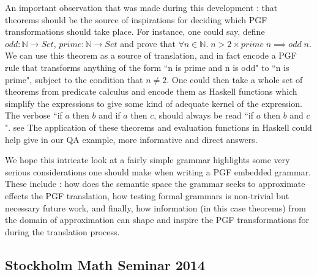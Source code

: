 An important observation that was made during this development : that theorems
should be the source of inspirations for deciding which PGF transformations
should take place. For instance, one could say, define $odd : \mathds{N}
\rightarrow Set$, $prime : \mathds{N} \rightarrow Set$ and prove that $\forall n
\in \mathds{N}.\; n > 2 \times prime\; n \implies odd\; n$. We can use this
theorem as a source of translation, and in fact encode a PGF rule that
transforms anything of the form ``n is prime and n is odd" to ``n is prime",
subject to the condition that $n \neq 2$. One could then take a whole set of
theorems from predicate calculus and encode them as Haskell functions which
simplify the expressions to give some kind of adequate kernel of the expression.
The verbose ``if $a$ then $b$ and if $a$ then $c$, should always be read ``if
$a$ then $b$ and $c$". see The application of these theorems and evaluation
functions in Haskell could help give in our QA example, more informative and
direct answers.

We hope this intricate look at a fairly simple grammar highlights some very
serious considerations one should make when writing a PGF embedded grammar.
These include : how does the semantic space the grammar seeks to approximate
effects the PGF translation, how testing formal grammars is non-trivial but
necessary future work, and finally, how information (in this case theorems) from
the domain of approximation can shape and inspire the PGF transformations for
during the translation process.



\subsection{Stockholm Math Seminar 2014}


